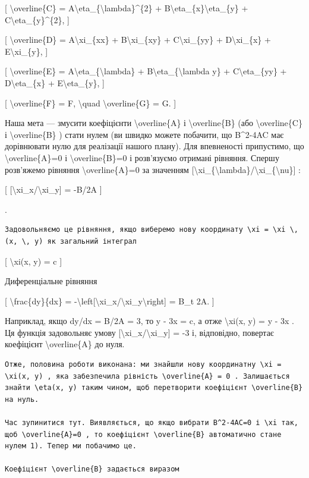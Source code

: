 \documentclass[
]{article}
\begin{document}
{[} \textbackslash overline\{C\} =
A\textbackslash eta\_\{\textbackslash lambda\}\^{}\{2\} +
B\textbackslash eta\_\{x\}\textbackslash eta\_\{y\} +
C\textbackslash eta\_\{y\}\^{}\{2\}, {]}

{[} \textbackslash overline\{D\} = A\textbackslash xi\_\{xx\} +
B\textbackslash xi\_\{xy\} + C\textbackslash xi\_\{yy\} +
D\textbackslash xi\_\{x\} + E\textbackslash xi\_\{y\}, {]}

{[} \textbackslash overline\{E\} =
A\textbackslash eta\_\{\textbackslash lambda\} +
B\textbackslash eta\_\{\textbackslash lambda y\} +
C\textbackslash eta\_\{yy\} + D\textbackslash eta\_\{x\} +
E\textbackslash eta\_\{y\}, {]}

{[} \textbackslash overline\{F\} = F, \textbackslash quad
\textbackslash overline\{G\} = G. {]}

Наша мета --- змусити коефіцієнти \textbackslash overline\{A\} і
\textbackslash overline\{B\} (або \textbackslash overline\{C\} і
\textbackslash overline\{B\} ) стати нулем (ви швидко можете побачити,
що B\^{}2-4AC має дорівнювати нулю для реалізації нашого плану). Для
впевненості припустимо, що \textbackslash overline\{A\}=0 і
\textbackslash overline\{B\}=0 і розв'язуємо отримані рівняння. Спершу
розв'яжемо рівняння \textbackslash overline\{A\}=0 за значенням
{[}\textbackslash xi\_\{\textbackslash lambda\}/\textbackslash xi\_\{\textbackslash nu\}{]}
:

{[} {[}\textbackslash xi\_x/\textbackslash xi\_y{]} = -B/2A {]}

.

\begin{verbatim}
Задовольняємо це рівняння, якщо виберемо нову координату \xi = \xi \, (x, \, y) як загальний інтеграл
\end{verbatim}

{[} \textbackslash xi(x, y) = c {]}

Диференціальне рівняння

{[} \textbackslash frac\{dy\}\{dx\} =
-\textbackslash left{[}\textbackslash xi\_x/\textbackslash xi\_y\textbackslash right{]}
= B\_t 2A. {]}

Наприклад, якщо dy/dx = B/2A = 3, то y - 3x = c, а отже
\textbackslash xi(x, y) = y - 3x . Ця функція задовольняє умову
{[}\textbackslash xi\_x/\textbackslash xi\_y{]} = -3 і, відповідно,
повертає коефіцієнт \textbackslash overline\{A\} до нуля.

\begin{verbatim}
Отже, половина роботи виконана: ми знайшли нову координатну \xi = \xi(x, y) , яка забезпечила рівність \overline{A} = 0 . Залишається знайти \eta(x, y) таким чином, щоб перетворити коефіцієнт \overline{B} на нуль.

Час зупинитися тут. Виявляється, що якщо вибрати B^2-4AC=0 і \xi так, щоб \overline{A}=0 , то коефіцієнт \overline{B} автоматично стане нулем 1). Тепер ми побачимо це.

Коефіцієнт \overline{B} задається виразом
\end{verbatim}
\end{document}
